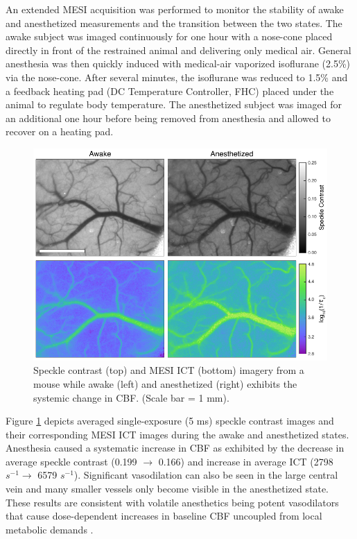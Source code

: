 An extended MESI acquisition was performed to monitor the stability of awake and anesthetized measurements and the transition between the two states. The awake subject was imaged continuously for one hour with a nose-cone placed directly in front of the restrained animal and delivering only medical air. General anesthesia was then quickly induced with medical-air vaporized isoflurane (2.5\%) via the nose-cone. After several minutes, the isoflurane was reduced to 1.5\% and a feedback heating pad (DC Temperature Controller, FHC) placed under the animal to regulate body temperature. The anesthetized subject was imaged for an additional one hour before being removed from anesthesia and allowed to recover on a heating pad.

\begin{figure}
    \includegraphics{figures/chapter_5/speckleawakeanes.pdf}
    \caption{
        \label{fig:speckleawakeanes}
        Speckle contrast (top) and MESI ICT (bottom) imagery from a mouse while awake (left) and anesthetized (right) exhibits the systemic change in CBF. (Scale bar = 1 mm).
    }
\end{figure}

Figure \ref{fig:speckleawakeanes} depicts averaged single-exposure (5 ms) speckle contrast images and their corresponding MESI ICT images during the awake and anesthetized states. Anesthesia caused a systematic increase in CBF as exhibited by the decrease in average speckle contrast (0.199 $\to$ 0.166) and increase in average ICT (2798 $s^{-1} \to$ 6579 $s^{-1}$). Significant vasodilation can also be seen in the large central vein and many smaller vessels only become visible in the anesthetized state. These results are consistent with volatile anesthetics being potent vasodilators that cause dose-dependent increases in baseline CBF uncoupled from local metabolic demands \cite{Masamoto:2012bj}.




